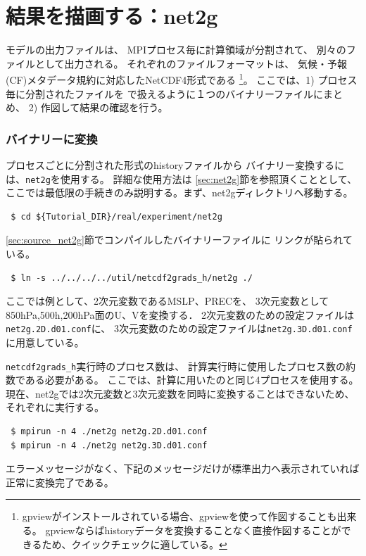 \section{結果を描画する：net2g} \label{sec:quicklook}

\scalerm モデルの出力ファイルは、
MPIプロセス毎に計算領域が分割されて、
別々のファイルとして出力される。
それぞれのファイルフォーマットは、
気候・予報(CF)メタデータ規約に対応したNetCDF4形式である
\footnote{gpviewがインストールされている場合、gpviewを使って作図することも出来る。
gpviewならばhistoryデータを変換することなく直接作図することができるため、クイックチェックに適している。}。
ここでは、1) プロセス毎に分割された{\netcdf}ファイルを
{\grads}で扱えるように１つのバイナリーファイルにまとめ、
2) 作図して結果の確認を行う。

\subsubsection{{\grads}バイナリーに変換}
プロセスごとに分割された{\netcdf}形式のhistoryファイルから
{\grads}バイナリー変換するには、\verb|net2g|を使用する。
詳細な使用方法は \ref{sec:net2g}節を参照頂くこととして、
ここでは最低限の手続きのみ説明する。まず、net2gディレクトリへ移動する。
\begin{verbatim}
 $ cd ${Tutorial_DIR}/real/experiment/net2g
\end{verbatim}

\ref{sec:source_net2g}節でコンパイルしたバイナリーファイルに
リンクが貼られている。
\begin{verbatim}
 $ ln -s ../../../../util/netcdf2grads_h/net2g ./
\end{verbatim}
ここでは例として、2次元変数であるMSLP、PRECを、
3次元変数として850hPa,500h,200hPa面のU、Vを変換する．
2次元変数のための設定ファイルは\verb|net2g.2D.d01.conf|に、
3次元変数のための設定ファイルは\verb|net2g.3D.d01.conf|に用意している。

\verb|netcdf2grads_h|実行時のプロセス数は、
計算実行時に使用したプロセス数の約数である必要がある。
ここでは、計算に用いたのと同じ4プロセスを使用する。
現在、net2gでは2次元変数と3次元変数を同時に変換することはできないため、
それぞれに実行する。
\begin{verbatim}
 $ mpirun -n 4 ./net2g net2g.2D.d01.conf
 $ mpirun -n 4 ./net2g net2g.3D.d01.conf
\end{verbatim}
エラーメッセージがなく、下記のメッセージだけが標準出力へ表示されていれば正常に変換完了である。\\


